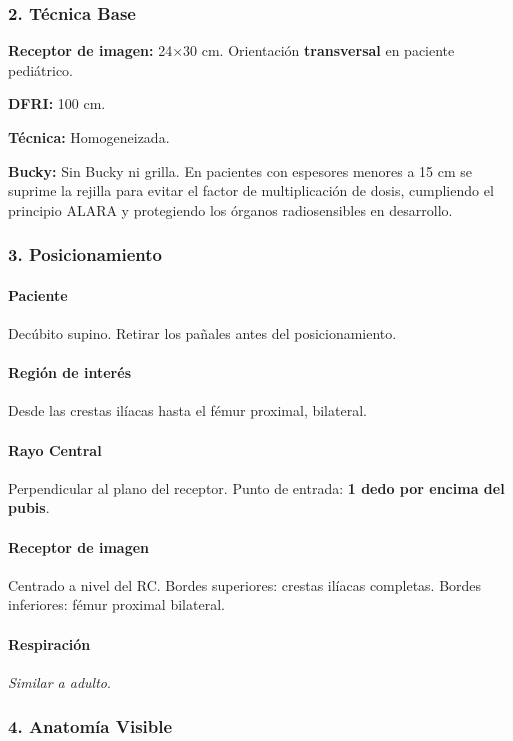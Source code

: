 	\subsubsection*{2. Técnica Base}
	
	\textbf{Receptor de imagen:} 24$\times$30 cm. Orientación \textbf{transversal} en paciente pediátrico.
	
	\textbf{DFRI:} 100 cm.
	
	\textbf{Técnica:} Homogeneizada.
	
	\textbf{Bucky:} Sin Bucky ni grilla. En pacientes con espesores menores a 15 cm se suprime la rejilla para evitar el factor de multiplicación de dosis, cumpliendo el principio ALARA y protegiendo los órganos radiosensibles en desarrollo.
	
	\subsubsection*{3. Posicionamiento}
	
	\paragraph{Paciente}
	Decúbito supino. Retirar los pañales antes del posicionamiento.
	
	\paragraph{Región de interés}
	Desde las crestas ilíacas hasta el fémur proximal, bilateral.
	
	\paragraph{Rayo Central}
	Perpendicular al plano del receptor. Punto de entrada: \textbf{1 dedo por encima del pubis}.
	
	\paragraph{Receptor de imagen}
	Centrado a nivel del RC. Bordes superiores: crestas ilíacas completas. Bordes inferiores: fémur proximal bilateral.
	
	\paragraph{Respiración}
	\textit{Similar a adulto}.
	
	\subsubsection*{4. Anatomía Visible}
	
